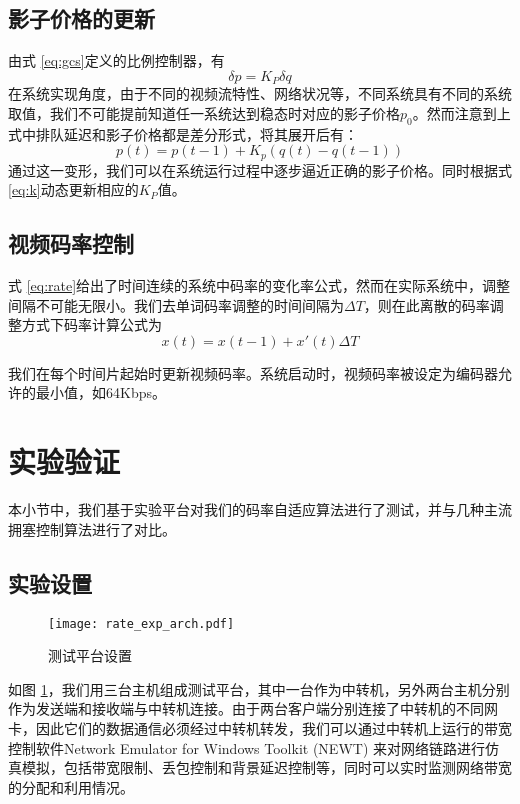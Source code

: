     \subsection{影子价格的更新}
    由式 \ref{eq:gcs}定义的比例控制器，有
    \begin{equation}\label{eq:kpt}
        \delta p = K_P \delta q
    \end{equation}
    在系统实现角度，由于不同的视频流特性、网络状况等，不同系统具有不同的系统取值，我们不可能提前知道任一系统达到稳态时对应的影子价格$p_0$。然而注意到上式中排队延迟和影子价格都是差分形式，将其展开后有：
    \begin{equation}
        p(t) = p(t-1) + K_p(q(t) - q(t-1))
    \end{equation}
    通过这一变形，我们可以在系统运行过程中逐步逼近正确的影子价格。同时根据式\ref{eq:k}动态更新相应的$K_P$值。

    \subsection{视频码率控制}
    式 \ref{eq:rate}给出了时间连续的系统中码率的变化率公式，然而在实际系统中，调整间隔不可能无限小。我们去单词码率调整的时间间隔为$\Delta{T}$，则在此离散的码率调整方式下码率计算公式为
    \begin{equation}
        x(t) = x(t-1) + x'(t) \Delta{T}
    \end{equation}

    我们在每个时间片起始时更新视频码率。系统启动时，视频码率被设定为编码器允许的最小值，如64Kbps。


\section{实验验证}
本小节中，我们基于实验平台对我们的码率自适应算法进行了测试，并与几种主流拥塞控制算法进行了对比。

    \subsection{实验设置}

    \begin{figure}[htbp]
      \centering
      \texttt{[image: rate\_exp\_arch.pdf]}
      \caption{测试平台设置}
      \label{fig:rate_exp_arch}
    \end{figure}

    如图 \ref{fig:rate_exp_arch}，我们用三台主机组成测试平台，其中一台作为中转机，另外两台主机分别作为发送端和接收端与中转机连接。由于两台客户端分别连接了中转机的不同网卡，因此它们的数据通信必须经过中转机转发，我们可以通过中转机上运行的带宽控制软件Network Emulator for Windows Toolkit (NEWT) 来对网络链路进行仿真模拟，包括带宽限制、丢包控制和背景延迟控制等，同时可以实时监测网络带宽的分配和利用情况。


